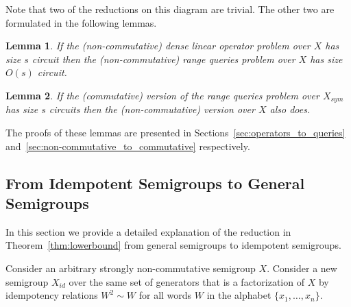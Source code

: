 \documentclass[11pt,letterpaper]{article}
\newtheorem{lemma}{Lemma}
\begin{document}
Note that two of the reductions on this diagram are trivial. The other two are formulated in the following lemmas.


%
%

\begin{lemma} \label{lem:dense_matrices}
If the (non-commutative) dense linear operator problem over $X$ has size $s$ circuit then the (non-commutative) range queries problem over $X$ has size $O(s)$ circuit.
\end{lemma}

\begin{lemma} \label{lem:intervals}
If the (commutative) version of the range queries problem over $X_{sym}$ has size $s$ circuits then the (non-commutative) version over $X$ also does.
\end{lemma}

The proofs of these lemmas are presented in Sections~\ref{sec:operators_to_queries} and~\ref{sec:non-commutative_to_commutative} respectively.


\subsection{From Idempotent Semigroups to General Semigroups}\label{sec:noncommutative_extension}

In this section we provide a detailed explanation of the reduction in Theorem~\ref{thm:lowerbound} from general semigroups to idempotent semigroups.

Consider an arbitrary strongly non-commutative semigroup $X$. Consider a new semigroup $X_{id}$ over the same set of generators that is a factorization of $X$ by idempotency relations $W^2\sim W$ for all words $W$ in the alphabet $\{x_1,\ldots, x_n\}$.
\end{document}
